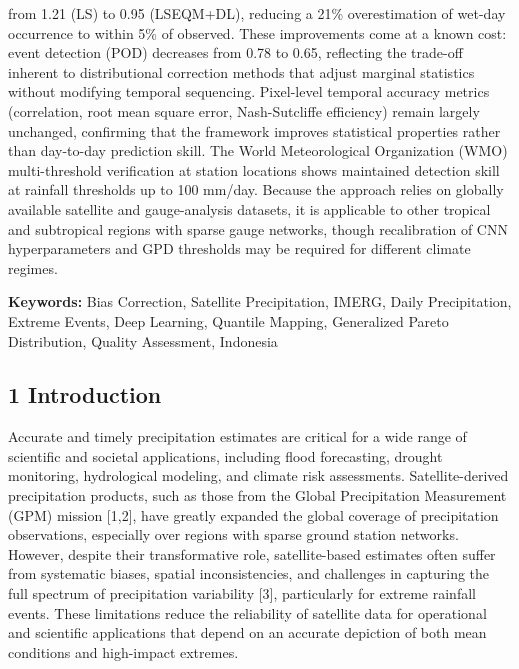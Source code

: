 \documentclass[
]{article}
\begin{document}
from 1.21 (LS) to 0.95 (LSEQM+DL), reducing a 21\% overestimation of
wet-day occurrence to within 5\% of observed. These improvements come at
a known cost: event detection (POD) decreases from 0.78 to 0.65,
reflecting the trade-off inherent to distributional correction methods
that adjust marginal statistics without modifying temporal sequencing.
Pixel-level temporal accuracy metrics (correlation, root mean square
error, Nash-Sutcliffe efficiency) remain largely unchanged, confirming
that the framework improves statistical properties rather than
day-to-day prediction skill. The World Meteorological Organization (WMO)
multi-threshold verification at station locations shows maintained
detection skill at rainfall thresholds up to 100 mm/day. Because the
approach relies on globally available satellite and gauge-analysis
datasets, it is applicable to other tropical and subtropical regions
with sparse gauge networks, though recalibration of CNN hyperparameters
and GPD thresholds may be required for different climate regimes.

\textbf{Keywords:} Bias Correction, Satellite Precipitation, IMERG,
Daily Precipitation, Extreme Events, Deep Learning, Quantile Mapping,
Generalized Pareto Distribution, Quality Assessment, Indonesia

\subsection{1 Introduction}\label{introduction}

Accurate and timely precipitation estimates are critical for a wide
range of scientific and societal applications, including flood
forecasting, drought monitoring, hydrological modeling, and climate risk
assessments. Satellite-derived precipitation products, such as those
from the Global Precipitation Measurement (GPM) mission {[}1,2{]}, have
greatly expanded the global coverage of precipitation observations,
especially over regions with sparse ground station networks. However,
despite their transformative role, satellite-based estimates often
suffer from systematic biases, spatial inconsistencies, and challenges
in capturing the full spectrum of precipitation variability {[}3{]},
particularly for extreme rainfall events. These limitations reduce the
reliability of satellite data for operational and scientific
applications that depend on an accurate depiction of both mean
conditions and high-impact extremes.
\end{document}
